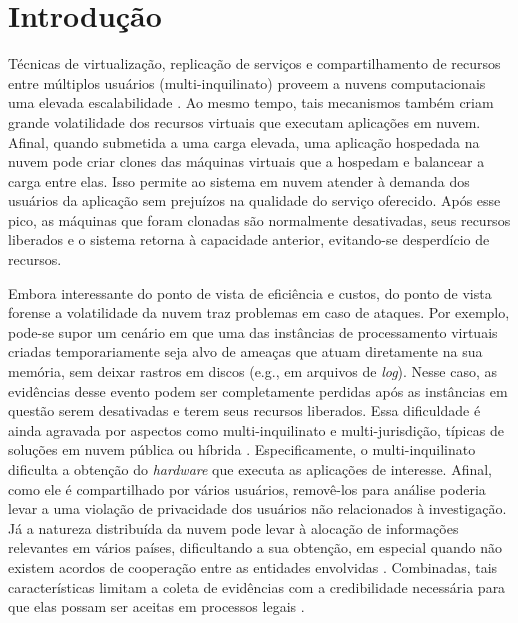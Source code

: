 \chapter{Introdução}
\label{chp:intro}

%
Técnicas de virtualização, replicação de serviços e compartilhamento de recursos entre múltiplos usuários (multi-inquilinato) proveem a nuvens computacionais uma elevada escalabilidade \cite{MorsyCloudSecurity:2010}.
%
Ao mesmo tempo, tais mecanismos também criam grande volatilidade dos recursos virtuais que executam aplicações em nuvem.
%
Afinal, quando submetida a uma carga elevada, uma aplicação hospedada na nuvem pode criar clones das máquinas virtuais que a hospedam e balancear a carga entre elas.
%
Isso permite ao sistema em nuvem atender à demanda dos usuários da aplicação sem prejuízos na qualidade do serviço oferecido. 
%
Após esse pico, as máquinas que foram clonadas são normalmente desativadas, seus recursos liberados e o sistema retorna à capacidade anterior, evitando-se desperdício de recursos.


%
Embora interessante do ponto de vista de eficiência e custos, do ponto de vista forense a volatilidade da nuvem traz problemas em caso de ataques.
%
Por exemplo, pode-se supor um cenário em que uma das instâncias de processamento virtuais criadas temporariamente seja alvo de ameaças que atuam diretamente na sua memória, sem deixar rastros em discos (e.g., em arquivos de \textit{log}).
%
Nesse caso, as evidências desse evento podem ser completamente perdidas após as instâncias em questão serem desativadas e terem seus recursos liberados.
%
Essa dificuldade é ainda agravada por aspectos como multi-inquilinato e multi-jurisdição, típicas de soluções em nuvem pública ou híbrida \cite{BashAdvInForensics:2015}.
%
Especificamente, o multi-inquilinato dificulta a obtenção do \textit{hardware} que executa as aplicações de interesse.
%
Afinal, como ele é compartilhado por vários usuários, removê-los para análise poderia levar a uma violação de privacidade dos usuários não relacionados à investigação. 
%
Já a natureza distribuída da nuvem pode levar à alocação de informações relevantes em vários países, dificultando a sua obtenção, em especial quando não existem acordos de cooperação entre as entidades envolvidas \cite{DykstraAcquiringForIAAS:2012}.
%
Combinadas, tais características limitam a coleta de evidências com a credibilidade necessária para que elas possam ser aceitas em processos legais \cite{RahmanLiveForensicsTechniques:2015}.
